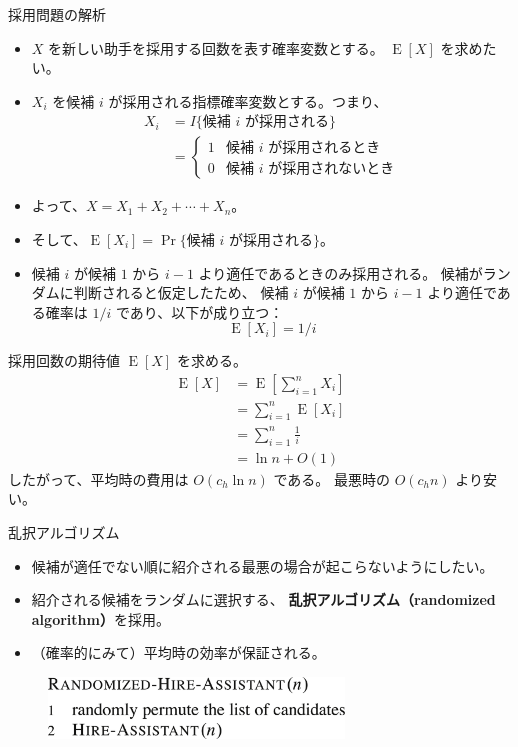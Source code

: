 \documentclass[unicode,11pt,aspectratio=169,notes]{beamer} %
\DeclareMathOperator{\E}{\mathrm{E}}
\begin{document}
\begin{frame}{採用問題の解析}
  \begin{itemize}
    \item<+-> $X$ を新しい助手を採用する回数を表す確率変数とする。
    $\E[X]$ を求めたい。
    \item<+-> $X_i$ を候補 $i$ が採用される指標確率変数とする。つまり、
    \begin{align*}
      X_i & = I\{\text{候補 $i$ が採用される}\} \\
          & =
          \begin{cases}
            1 & \text{候補 $i$ が採用されるとき} \\
            0 & \text{候補 $i$ が採用されないとき} 
          \end{cases}
    \end{align*}
    \item<+-> よって、$X=X_1+X_2+\cdots+X_n$。
    \item<+-> そして、$\E[X_i]=\Pr\{\text{候補 $i$ が採用される}\}$。
    \item<+-> 候補 $i$ が候補 $1$ から $i-1$ より適任であるときのみ採用される。
    候補がランダムに判断されると仮定したため、
    候補 $i$ が候補 $1$ から $i-1$ より適任である確率は $1/i$ であり、以下が成り立つ：
    \[
      \E[X_i]=1/i
    \]
  \end{itemize}
\end{frame}

\begin{frame}{採用回数の期待値}
  $\E[X]$ を求める。
  \begin{align*}
    \E[X] & = \E\left[\sum_{i=1}^nX_i\right] \\
          & = \sum_{i=1}^n\E[X_i] \\
          & = \sum_{i=1}^n\frac{1}{i} \\
          & = \ln n + O(1)
  \end{align*}
  したがって、平均時の費用は $O(c_h\ln n)$ である。
  最悪時の $O(c_hn)$ より安い。
\end{frame}

\begin{frame}{乱択アルゴリズム}
  \begin{itemize}
    \item 候補が適任でない順に紹介される最悪の場合が起こらないようにしたい。
    \item 紹介される候補をランダムに選択する、
    \textbf{乱択アルゴリズム（randomized algorithm）}を採用。
    \item （確率的にみて）平均時の効率が保証される。
  \end{itemize}
  \begin{figure}
    \includegraphics[width=0.70\textwidth]{../resources/pseudo-05-02}
  \end{figure}
\end{frame}
\end{document}
